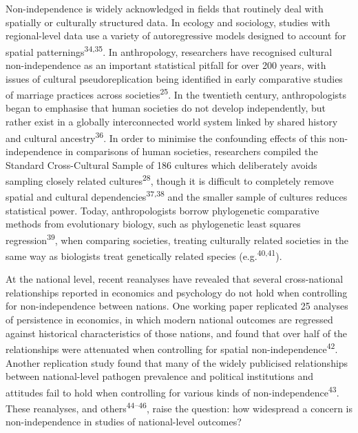 \documentclass[
  man,floatsintext]{apa6}
\begin{document}
Non-independence is widely acknowledged in fields that routinely deal with spatially or culturally structured data. In ecology and sociology, studies with regional-level data use a variety of autoregressive models designed to account for spatial patternings\textsuperscript{34,35}. In anthropology, researchers have recognised cultural non-independence as an important statistical pitfall for over 200 years, with issues of cultural pseudoreplication being identified in early comparative studies of marriage practices across societies\textsuperscript{25}. In the twentieth century, anthropologists began to emphasise that human societies do not develop independently, but rather exist in a globally interconnected world system linked by shared history and cultural ancestry\textsuperscript{36}. In order to minimise the confounding effects of this non-independence in comparisons of human societies, researchers compiled the Standard Cross-Cultural Sample of 186 cultures which deliberately avoids sampling closely related cultures\textsuperscript{28}, though it is difficult to completely remove spatial and cultural dependencies\textsuperscript{37,38} and the smaller sample of cultures reduces statistical power. Today, anthropologists borrow phylogenetic comparative methods from evolutionary biology, such as phylogenetic least squares regression\textsuperscript{39}, when comparing societies, treating culturally related societies in the same way as biologists treat genetically related species (e.g.\textsuperscript{40,41}).

At the national level, recent reanalyses have revealed that several cross-national relationships reported in economics and psychology do not hold when controlling for non-independence between nations. One working paper replicated 25 analyses of persistence in economics, in which modern national outcomes are regressed against historical characteristics of those nations, and found that over half of the relationships were attenuated when controlling for spatial non-independence\textsuperscript{42}. Another replication study found that many of the widely publicised relationships between national-level pathogen prevalence and political institutions and attitudes fail to hold when controlling for various kinds of non-independence\textsuperscript{43}. These reanalyses, and others\textsuperscript{44--46}, raise the question: how widespread a concern is non-independence in studies of national-level outcomes?
\end{document}
